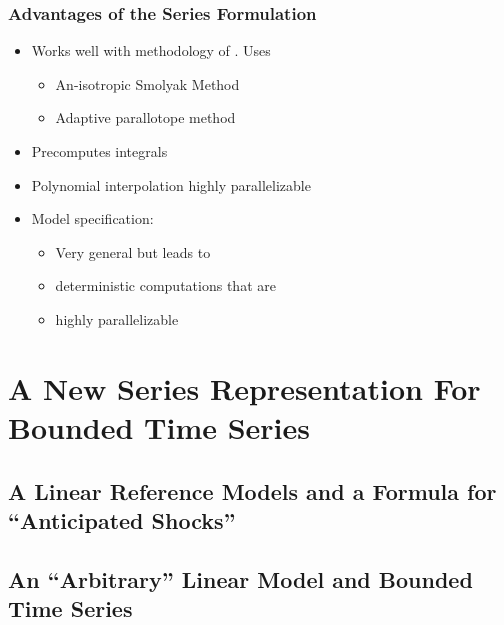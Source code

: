 \documentclass[notheorems]{beamer}
\begin{document}
\begin{frame}
  \frametitle{Advantages of the Series Formulation}
  \begin{itemize}
  \item Works well with methodology of  \cite{Judd2014}.  Uses
    \begin{itemize}
    \item An-isotropic Smolyak Method 
    \item Adaptive parallotope method
    \end{itemize}
  \item Precomputes integrals
  \item Polynomial interpolation highly parallelizable
  \item Model specification: 
    \begin{itemize}
    \item Very general  but leads to 
\item deterministic computations that are 
    \item highly parallelizable 
    \end{itemize}
  \end{itemize}
\end{frame}





\section{A New Series Representation For  Bounded Time Series}
\label{sec:newseries}

\subsection{A Linear Reference Models and a Formula for  ``Anticipated Shocks''}
\label{sec:linref}



\subsection{ An  ``Arbitrary'' Linear Model and  Bounded Time Series}
\label{sec:almostarbitrary}
\end{document}
